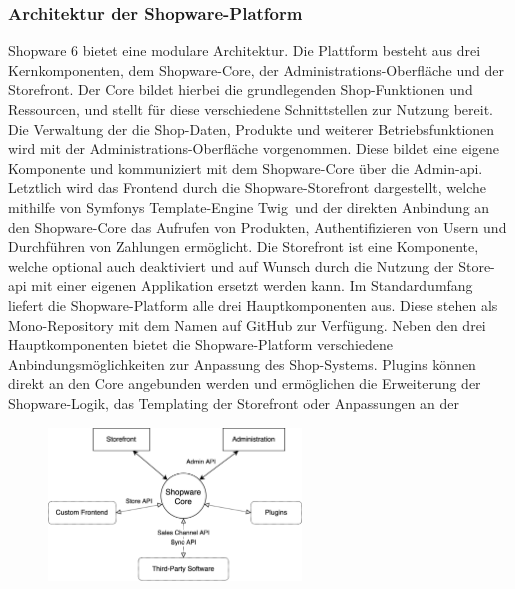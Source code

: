 \subsubsection{Architektur der Shopware-Platform}

Shopware 6 bietet eine modulare Architektur.
Die Plattform besteht aus drei Kernkomponenten, dem Shopware-Core, der Administrations-Oberfläche und der Storefront.
Der Core bildet hierbei die grundlegenden Shop-Funktionen und Ressourcen, und stellt für diese verschiedene
Schnittstellen zur Nutzung bereit.
Die Verwaltung der die Shop-Daten, Produkte und weiterer Betriebsfunktionen wird mit der Administrations-Oberfläche
vorgenommen.
Diese bildet eine eigene Komponente und kommuniziert mit dem Shopware-Core über die Admin-\acrshort{api}.
Letztlich wird das Frontend durch die Shopware-Storefront dargestellt, welche mithilfe von Symfonys Template-Engine
\glqq Twig\grqq\ und der direkten Anbindung an den Shopware-Core das Aufrufen von Produkten, Authentifizieren von Usern
und Durchführen von Zahlungen ermöglicht.
Die Storefront ist eine Komponente, welche optional auch deaktiviert und auf Wunsch durch die
Nutzung der Store-\acrshort{api} mit einer eigenen Applikation ersetzt werden kann.
Im Standardumfang liefert die Shopware-Platform alle drei Hauptkomponenten aus.
Diese stehen als Mono-Repository mit dem Namen  auf GitHub zur Verfügung.
Neben den drei Hauptkomponenten bietet die Shopware-Platform verschiedene Anbindungsmöglichkeiten zur Anpassung des
Shop-Systems.
Plugins können direkt an den Core angebunden werden und ermöglichen die Erweiterung der Shopware-Logik, das Templating
der Storefront oder Anpassungen an der
\begin{figure}
    \centering
    \includegraphics[width=0.60\textwidth]{images/content/shopware-architecture}
    \label{fig:shopware-architecture}
\end{figure}\!\!\!
